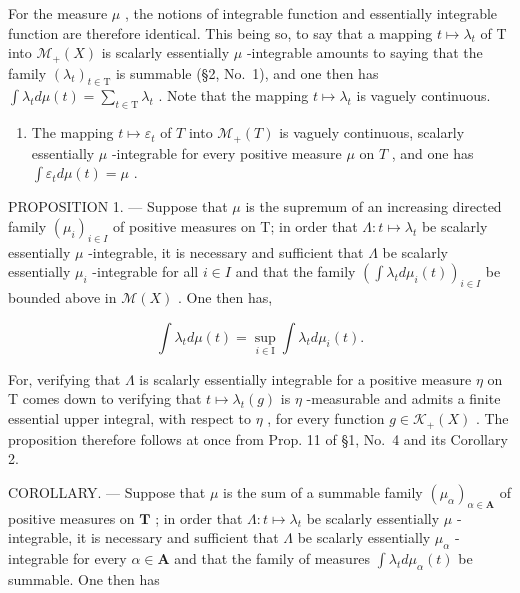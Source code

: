 For the measure \(\mu\) , the notions of integrable function and essentially integrable function are therefore identical. This being so, to say that a mapping \(t \mapsto \lambda_t\) of T into \(\mathcal{M}_+(X)\) is scalarly essentially \(\mu\) -integrable amounts to saying that the family \((\lambda_t)_{t \in \mathrm{T}}\) is summable (§2, No.~1), and one then has \(\int \lambda_t d\mu(t) = \sum_{t \in \mathrm{T}} \lambda_t\) . Note that the mapping \(t \mapsto \lambda_t\) is vaguely continuous.

\begin{enumerate}
\def\labelenumi{\arabic{enumi})}
\setcounter{enumi}{1}
\tightlist
\item
  The mapping \(t \mapsto \varepsilon_t\) of \(T\) into \(\mathcal{M}_+(T)\) is vaguely continuous, scalarly essentially \(\mu\) -integrable for every positive measure \(\mu\) on \(T\) , and one has \(\int \varepsilon_t d\mu(t) = \mu\) .
\end{enumerate}

PROPOSITION 1. --- Suppose that \(\mu\) is the supremum of an increasing directed family \((\mu_i)_{i \in I}\) of positive measures on T; in order that \(\Lambda : t \mapsto \lambda_t\) be scalarly essentially \(\mu\) -integrable, it is necessary and sufficient that \(\Lambda\) be scalarly essentially \(\mu_i\) -integrable for all \(i \in I\) and that the family \(\left( \int \lambda_t d\mu_i(t) \right)_{i \in I}\) be bounded above in \(\mathcal{M}(X)\) . One then has,

\[
\int \lambda_ {t} d \mu (t) = \sup _ {i \in \mathrm{I}} \int \lambda_ {t} d \mu_ {i} (t).\tag{2}
\]

For, verifying that \(\Lambda\) is scalarly essentially integrable for a positive measure \(\eta\) on T comes down to verifying that \(t \mapsto \lambda_{t}(g)\) is \(\eta\) -measurable and admits a finite essential upper integral, with respect to \(\eta\) , for every function \(g \in \mathcal{K}_{+}(X)\) . The proposition therefore follows at once from Prop. 11 of §1, No.~4 and its Corollary 2.

COROLLARY. --- Suppose that \(\mu\) is the sum of a summable family \((\mu_{\alpha})_{\alpha \in \mathbf{A}}\) of positive measures on \(\mathbf{T}\) ; in order that \(\Lambda : t \mapsto \lambda_t\) be scalarly essentially \(\mu\) -integrable, it is necessary and sufficient that \(\Lambda\) be scalarly essentially \(\mu_{\alpha}\) -integrable for every \(\alpha \in \mathbf{A}\) and that the family of measures \(\int \lambda_t d\mu_{\alpha}(t)\) be summable. One then has


